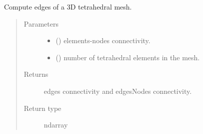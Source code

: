 \documentclass[letterpaper,10pt,english]{sphinxmanual}
\begin{document}
\begin{fulllineitems}
\label{\detokenize{petgem/mesh:petgem.mesh.computeEdges}}
Compute edges of a 3D tetrahedral mesh.
\begin{quote}\begin{description}
\item[{Parameters}] \leavevmode\begin{itemize}
\item {} 
 () \textendash{} elements-nodes connectivity.

\item {} 
 () \textendash{} number of tetrahedral elements in the mesh.

\end{itemize}

\item[{Returns}] \leavevmode
edges connectivity and edgesNodes connectivity.

\item[{Return type}] \leavevmode
ndarray

\end{description}\end{quote}

\end{fulllineitems}

\end{document}
